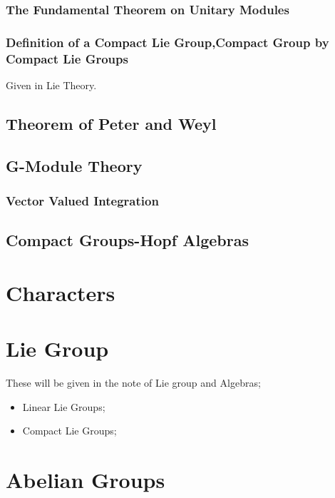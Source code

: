 \documentclass[Total.tex]{subfiles}
\begin{document}
				\subsection{The Fundamental Theorem on Unitary Modules}
				\subsection{Definition of a Compact Lie Group,Compact Group by Compact Lie Groups}
				
				Given in Lie Theory.
				
		\section{Theorem of Peter and Weyl}
		\section{G-Module Theory}
			\subsection{Vector Valued Integration}
		\section{Compact Groups-Hopf Algebras}
	\chapter{Characters}
	\chapter{Lie Group}
		These will be given in the note of Lie group and Algebras;
		\begin{itemize}
			\item Linear Lie Groups;
			\item Compact Lie Groups;
		\end{itemize}
	\chapter{Abelian Groups}
\end{document}
